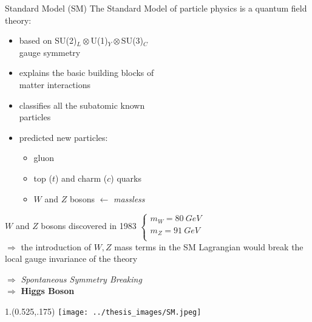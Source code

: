 \documentclass[10pt,UKenglish, leqno, xcolor = dvipsnames]{beamer}
\begin{document}
	\begin{frame}{Standard Model (SM)}
		\vfill
		The Standard Model of particle physics is a quantum field theory:
		\begin{itemize}
			\item based on SU(2)$_L\otimes$U(1)$_Y\otimes$SU(3)$_C$\\ gauge symmetry
			\item explains the basic building blocks of\\ matter interactions
			\item classifies all the subatomic known\\ particles
			\item predicted new particles:
			\begin{itemize}
				\item gluon
				\item top ($t$) and charm ($c$) quarks
				\item $W$ and $Z$ bosons $\leftarrow$ \textit{massless}
			\end{itemize}
		\end{itemize}
		$W$ and $Z$ bosons discovered in 1983
		$
		\begin{cases}
			m_W = 80\ GeV\\
			m_Z = 91\ GeV\\
		\end{cases}
		$\\
		$\Rightarrow$ the introduction of $W,Z$ mass terms in the SM Lagrangian would break the local gauge invariance of the theory\\ 
		\begin{center}
			$\Rightarrow$ \textit{Spontaneous Symmetry Breaking}\\
			$\Rightarrow$ \textbf{Higgs Boson}
		\end{center}
		\vfill
		\begin{textblock}{1.}(0.525,.175)
			\texttt{[image: ../thesis\_images/SM.jpeg]}
		\end{textblock}
	\end{frame}
\end{document}

